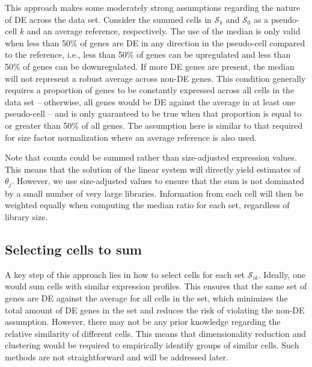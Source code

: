 \documentclass{article}
\begin{document}
This approach makes some moderately strong assumptions regarding the nature of DE across the data set.
Consider the summed cells in $\mathcal{S}_k$ and $\mathcal{S}_0$ as a pseudo-cell $k$ and an average reference, respectively.
The use of the median is only valid when less than 50\% of genes are DE in any direction in the pseudo-cell compared to the reference,
    i.e., less than 50\% of genes can be upregulated and less than 50\% of genes can be downregulated.
If more DE genes are present, the median will not represent a robust average across non-DE genes.
This condition generally requires a proportion of genes to be constantly expressed across all cells in the data set 
    -- otherwise, all genes would be DE against the average in at least one pseudo-cell -- 
    and is only guaranteed to be true when that proportion is equal to or greater than 50\% of all genes.
The assumption here is similar to that required for size factor normalization where an average reference is also used.

Note that counts could be summed rather than size-adjusted expression values.
This means that the solution of the linear system will directly yield estimates of $\theta_j$.
However, we use size-adjusted values to ensure that the sum is not dominated by a small number of very large libraries.
Information from each cell will then be weighted equally when computing the median ratio for each set, regardless of library size.

\subsection{Selecting cells to sum}
A key step of this approach lies in how to select cells for each set $\mathcal{S}_{ik}$.
Ideally, one would sum cells with similar expression profiles.
This ensures that the same set of genes are DE against the average for all cells in the set,
    which minimizes the total amount of DE genes in the set and reduces the risk of violating the non-DE assumption.
However, there may not be any prior knowledge regarding the relative similarity of different cells.
This means that dimensionality reduction and clustering would be required to empirically identify groups of similar cells.
Such methods are not straightforward and will be addressed later.
\end{document}
